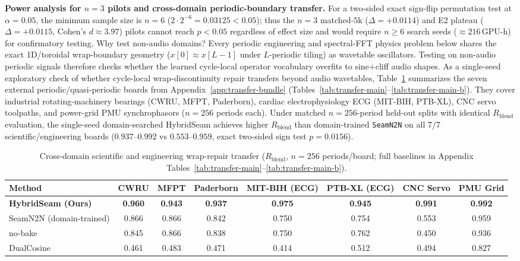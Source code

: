 \textbf{Power analysis for $n{=}3$ pilots and cross-domain periodic-boundary transfer.}
For a two-sided exact sign-flip permutation test at $\alpha{=}0.05$, the minimum sample size is $n{=}6$ ($2\cdot 2^{-6}{=}0.03125<0.05$); thus the $n{=}3$ matched-$5$k ($\Delta{=}{+}0.0114$) and E2 plateau ($\Delta{=}{+}0.0115$, Cohen's $d{\approx}3.97$) pilots cannot reach $p{<}0.05$ regardless of effect size and would require $n{\ge}6$ search seeds (${\approx}216$\,GPU-h) for confirmatory testing.
Why test non-audio domains? Every periodic engineering and spectral-FFT physics problem below shares the exact 1D/toroidal wrap-boundary geometry ($x[0]{\approx}x[L{-}1]$ under $L$-periodic tiling) as wavetable oscillators. Testing on non-audio periodic signals therefore checks whether the learned cycle-local operator vocabulary overfits to sine+cliff audio shapes.
As a single-seed exploratory check of whether cycle-local wrap-discontinuity repair transfers beyond audio wavetables, Table~\ref{tab:transfer-summary-main} summarizes the seven external periodic/quasi-periodic boards from Appendix~\ref{app:transfer-bundle} (Tables~\ref{tab:transfer-main}--\ref{tab:transfer-main-b}). They cover industrial rotating-machinery bearings (CWRU, MFPT, Paderborn), cardiac electrophysiology ECG (MIT-BIH, PTB-XL), CNC servo toolpaths, and power-grid PMU synchrophasors ($n{=}256$ periods each). Under matched $n{=}256$-period held-out splits with identical $R_{\mathrm{blend}}$ evaluation, the single-seed domain-searched HybridSeam achieves higher $R_{\mathrm{blend}}$ than domain-trained \texttt{SeamN2N} on all $7/7$ scientific/engineering boards ($0.937$--$0.992$ vs $0.553$--$0.959$, exact two-sided sign test $p{=}0.0156$).

\begin{table}[t]
  \centering
  \small
  \caption{Cross-domain scientific and engineering wrap-repair transfer ($R_{\mathrm{blend}}$, $n{=}256$ periods/board; full baselines in Appendix Tables~\ref{tab:transfer-main}--\ref{tab:transfer-main-b}).}
  \label{tab:transfer-summary-main}
  \setlength{\tabcolsep}{2pt}
  \begin{tabular}{@{}lccccccc@{}}
    \toprule
    Method & CWRU & MFPT & Paderborn & MIT-BIH (ECG) & PTB-XL (ECG) & CNC Servo & PMU Grid \\
    \midrule
    \textbf{HybridSeam (Ours)} & \textbf{0.960} & \textbf{0.943} & \textbf{0.937} & \textbf{0.975} & \textbf{0.945} & \textbf{0.991} & \textbf{0.992} \\
    SeamN2N (domain-trained) & 0.866 & 0.866 & 0.842 & 0.750 & 0.754 & 0.553 & 0.959 \\
    no-bake & 0.845 & 0.866 & 0.838 & 0.750 & 0.762 & 0.450 & 0.936 \\
    DualCosine & 0.461 & 0.483 & 0.471 & 0.414 & 0.512 & 0.494 & 0.827 \\
    \bottomrule
  \end{tabular}
\end{table}

